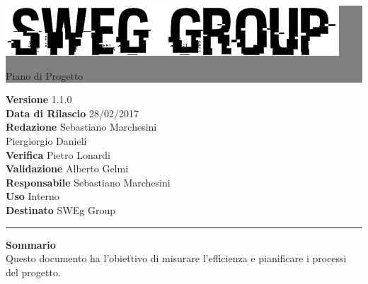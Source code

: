 \documentclass[12pt,a4paper,titlepage]{article}
\newcommand{\HRule}[1]{\hfill \rule{0.2\linewidth}{#1}} %
\begin{document}
	
	\thispagestyle{empty} %
	
	
	\colorbox{grey}{
		\parbox[t]{1.0\linewidth}{
			\centering \fontsize{50pt}{80pt}\selectfont %
			\vspace*{0.7cm} %
			
			\raggedleft
			\includegraphics[width=0.7\linewidth]{../../LogoSWEgGroupSFONDOVUOTO}
			
			\hfill Piano di Progetto \\
			
			\vspace*{0.7cm} %
		}
	}
	
	
	\vfill %
	
	
	{\centering \large 
		\hfill \textbf{Versione} 1.1.0 \\		
		\hfill \textbf{Data di Rilascio} 28/02/2017 \\ 
		\hfill \textbf{Redazione} Sebastiano Marchesini \\
		\hfill Piergiorgio Danieli \\
		\hfill \textbf{Verifica} Pietro Lonardi \\
		\hfill \textbf{Validazione} Alberto Gelmi \\
		\hfill \textbf{Responsabile} Sebastiano Marchesini \\
		\hfill \textbf{Uso} Interno \\
		\hfill \textbf{Destinato} SWEg Group \\ 
		
		\HRule{1pt}
		
		\textbf{Sommario} \\
		Questo documento ha l'obiettivo di misurare l'efficienza e pianificare i processi del progetto.
		
	} %
	
\end{document}
